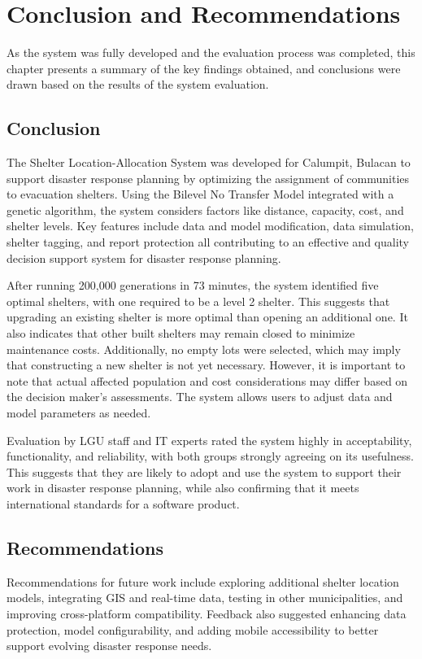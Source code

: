 \documentclass[11pt,letterpaper,]{article}
\begin{document}
\section{Conclusion and Recommendations}
As the system was fully developed and the evaluation process was completed,
this chapter presents a summary of the key findings obtained, and
conclusions were drawn based on the results of the system evaluation.
	
	\subsection{Conclusion}
	The Shelter Location-Allocation System was developed for Calumpit, Bulacan to support disaster response planning by optimizing the assignment of communities to evacuation shelters. Using the Bilevel No Transfer Model integrated with a genetic algorithm, the system considers factors like distance, capacity, cost, and shelter levels. Key features include data and model modification, data simulation, shelter tagging, and report protection all contributing to an effective and quality decision support system for disaster response planning. 
	
	After running 200,000 generations in 73 minutes, the system identified five optimal shelters, with one required to be a level 2 shelter. This suggests that upgrading an existing shelter is more optimal than opening an additional one. It also indicates that other built shelters may remain closed to minimize maintenance costs. Additionally, no empty lots were selected, which may imply that constructing a new shelter is not yet necessary. However, it is important to note that actual affected population and cost considerations may differ based on the decision maker's assessments. The system allows users to adjust data and model parameters as needed. 
	
	Evaluation by LGU staff and IT experts rated the system highly in acceptability, functionality, and reliability, with both groups strongly agreeing on its usefulness. This suggests that they are likely to adopt and use the system to support their work in disaster response planning, while also confirming that it meets international standards for a software product.
	
	\subsection{Recommendations}
	Recommendations for future work include exploring additional shelter location models, integrating GIS and real-time data, testing in other municipalities, and improving cross-platform compatibility. Feedback also suggested enhancing data protection, model configurability, and adding mobile accessibility to better support evolving disaster response needs.
	
	
\printbibliography[heading=bibintoc,title={REFERENCES}] %
\end{document}
